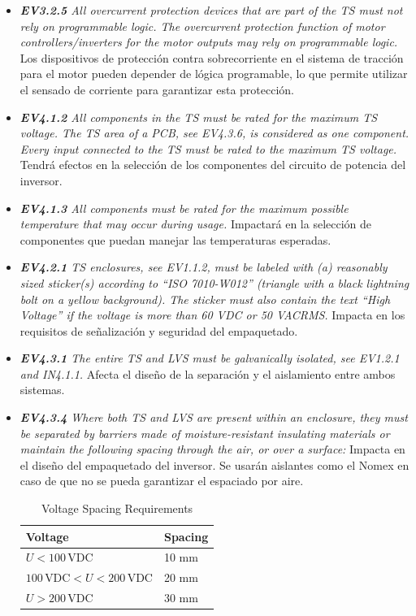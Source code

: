 \begin{itemize}
    \item \textit{\textbf{EV3.2.5} All overcurrent protection devices that are part of the TS must not rely on programmable logic. The overcurrent protection function of motor controllers/inverters for the motor outputs may rely on programmable logic.} Los dispositivos de protección contra sobrecorriente en el sistema de tracción para el motor pueden depender de lógica programable, lo que permite utilizar el sensado de corriente para garantizar esta protección.
    \item \textit{\textbf{EV4.1.2} All components in the TS must be rated for the maximum TS voltage. The TS area of a PCB, see EV4.3.6, is considered as one component. Every input connected to the TS must be rated to the maximum TS voltage.} Tendrá efectos en la selección de los componentes del circuito de potencia del inversor.
    \item \textit{\textbf{EV4.1.3}  All components must be rated for the maximum possible temperature that may occur during usage.} Impactará en la selección de componentes que puedan manejar las temperaturas esperadas.
    \item \textit{\textbf{EV4.2.1} TS enclosures, see EV1.1.2, must be labeled with (a) reasonably sized sticker(s) according to “ISO 7010-W012” (triangle with a black lightning bolt on a yellow background). The sticker must also contain the text “High Voltage” if the voltage is more than 60 VDC or 50 VACRMS.} Impacta en los requisitos de señalización y seguridad del empaquetado.
    \item \textit{\textbf{EV4.3.1} The entire TS and LVS must be galvanically isolated, see EV1.2.1 and IN4.1.1.} Afecta el diseño de la separación y el aislamiento entre ambos sistemas.
    \item \textit{\textbf{EV4.3.4} Where both TS and LVS are present within an enclosure, they must be separated by barriers made of moisture-resistant insulating materials or maintain the following spacing through the air, or over a surface:} Impacta en el diseño del empaquetado del inversor.  Se usarán aislantes como el Nomex en caso de que no se pueda garantizar el espaciado por aire.

	\begin{table}[H]
		\centering
		\caption{Voltage Spacing Requirements}
		\begin{tabular}{|l|l|}
			\hline
			Voltage         & Spacing     \\ \hline
			\(U < 100 \, \text{VDC}\)  & 10 mm       \\ \hline
			\(100 \, \text{VDC} < U < 200 \, \text{VDC}\) & 20 mm       \\ \hline
			\(U > 200 \, \text{VDC}\)  & 30 mm       \\ \hline
		\end{tabular}
	\end{table}


\end{itemize}
